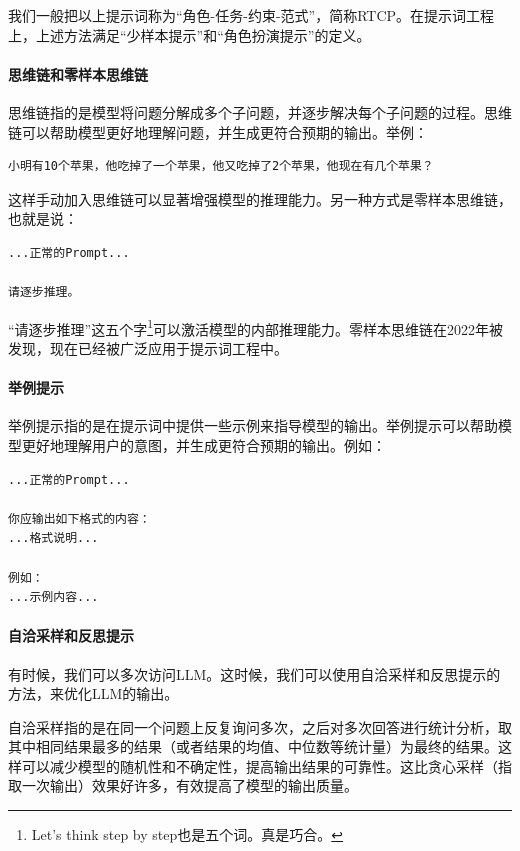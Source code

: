 我们一般把以上提示词称为“角色-任务-约束-范式”，简称RTCP。在提示词工程上，上述方法满足“少样本提示”和“角色扮演提示”的定义。

\paragraph{思维链和零样本思维链}

思维链指的是模型将问题分解成多个子问题，并逐步解决每个子问题的过程。思维链可以帮助模型更好地理解问题，并生成更符合预期的输出。举例：

\begin{verbatim}
小明有10个苹果，他吃掉了一个苹果，他又吃掉了2个苹果，他现在有几个苹果？
\end{verbatim}

这样手动加入思维链可以显著增强模型的推理能力。另一种方式是零样本思维链，也就是说：
\begin{verbatim}
...正常的Prompt...

请逐步推理。
\end{verbatim}
“请逐步推理”这五个字\footnote{Let's think step by step也是五个词。真是巧合。}可以激活模型的内部推理能力。零样本思维链在2022年被发现，现在已经被广泛应用于提示词工程中。

\paragraph{举例提示}举例提示指的是在提示词中提供一些示例来指导模型的输出。举例提示可以帮助模型更好地理解用户的意图，并生成更符合预期的输出。例如：

\begin{verbatim}
...正常的Prompt...

你应输出如下格式的内容：
...格式说明...

例如：
...示例内容...
\end{verbatim}

\paragraph{自洽采样和反思提示}

有时候，我们可以多次访问LLM。这时候，我们可以使用自洽采样和反思提示的方法，来优化LLM的输出。

自洽采样指的是在同一个问题上反复询问多次，之后对多次回答进行统计分析，取其中相同结果最多的结果（或者结果的均值、中位数等统计量）为最终的结果。这样可以减少模型的随机性和不确定性，提高输出结果的可靠性。这比贪心采样（指取一次输出）效果好许多，有效提高了模型的输出质量。

